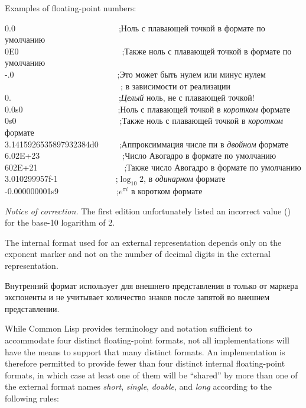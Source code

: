 Examples of floating-point numbers:
\begin{lisp}
0.0~~~~~~~~~~~~~~~~~~~~~~~~~;{\rm Ноль с плавающей точкой в формате по умолчанию} \\
0E0~~~~~~~~~~~~~~~~~~~~~~~~~;{\rm Также ноль с плавающей точкой в формате по умолчанию} \\
-.0~~~~~~~~~~~~~~~~~~~~~~~~~;{\rm Это может быть нулем или минус нулем} \\
~~~~~~~~~~~~~~~~~~~~~~~~~~~~; {\rm в зависимости от реализации} \\
0.~~~~~~~~~~~~~~~~~~~~~~~~~~;{\rm {\it Целый} ноль, не с плавающей точкой!} \\
0.0s0~~~~~~~~~~~~~~~~~~~~~~~;{\rm Ноль с плавающей точкой в {\it коротком} формате} \\
0s0~~~~~~~~~~~~~~~~~~~~~~~~~;{\rm Также ноль с плавающей точкой в {\it коротком} формате} \\
3.1415926535897932384d0~~~~~;{\rm Аппроксиммация числе пи в {\it двойном} формате} \\
6.02E+23~~~~~~~~~~~~~~~~~~~~;{\rm Число Авогадро в формате по умолчанию} \\
602E+21~~~~~~~~~~~~~~~~~~~~~;{\rm Также число Авогадро в формате по умолчанию} \\
3.010299957f-1~~~~~~~~~~~~~~;{\rm \(\log_{10} 2\), в {\it одинарном} формате} \\
-0.000000001s9~~~~~~~~~~~~~~;{\rm \(e^{\pi i}\) в коротком формате}
\end{lisp}

\begin{new}%
{\it Notice of correction.}
The first edition unfortunately listed an incorrect value ()
for the base-10 logarithm of 2.
\end{new}

The internal format used for an external representation depends only
on the exponent marker and not on the number of decimal digits
in the external representation.

Внутренний формат использует для внешнего представления в только от
маркера экспоненты и не учитывает количество знаков после запятой во внешнем
представлении. 

While Common Lisp provides terminology and notation sufficient
to accommodate four distinct floating-point formats,
not all implementations will have the means to support
that many distinct formats.
An implementation is therefore permitted to provide
fewer than four distinct internal floating-point formats,
in which case at least one of them will be ``shared''
by more than one of the external format names {\it short}, {\it single},
{\it double}, and {\it long} according to the following rules:

